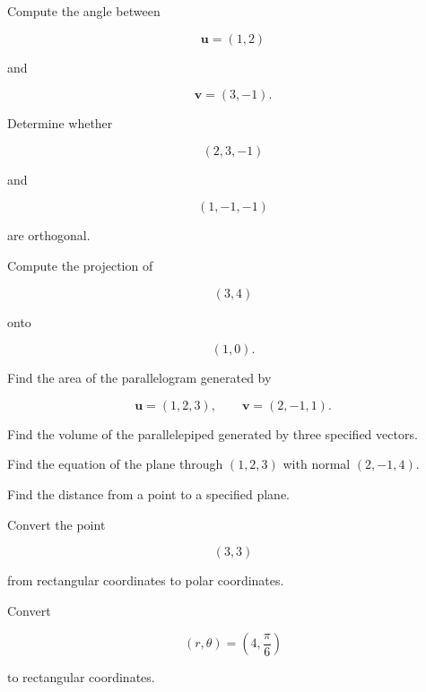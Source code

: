 \begin{exercise}[2]
Compute the angle between

\[
\mathbf{u}=(1,2)
\]

and

\[
\mathbf{v}=(3,-1).
\]
\end{exercise}

\begin{exercise}[2]
Determine whether

\[
(2,3,-1)
\]

and

\[
(1,-1,-1)
\]

are orthogonal.
\end{exercise}

\begin{exercise}[2]
Compute the projection of

\[
(3,4)
\]

onto

\[
(1,0).
\]
\end{exercise}

\begin{exercise}[3]
Find the area of the parallelogram generated by

\[
\mathbf{u}=(1,2,3),
\qquad
\mathbf{v}=(2,-1,1).
\]
\end{exercise}

\begin{exercise}[3]
Find the volume of the parallelepiped generated by three specified vectors.
\end{exercise}

\begin{exercise}[2]
Find the equation of the plane through \((1,2,3)\) with normal
\((2,-1,4)\).
\end{exercise}

\begin{exercise}[2]
Find the distance from a point to a specified plane.
\end{exercise}

\begin{exercise}[2]
Convert the point

\[
(3,3)
\]

from rectangular coordinates to polar coordinates.
\end{exercise}

\begin{exercise}[2]
Convert

\[
(r,\theta)
=
\left(
4,\frac{\pi}{6}
\right)
\]

to rectangular coordinates.
\end{exercise}

